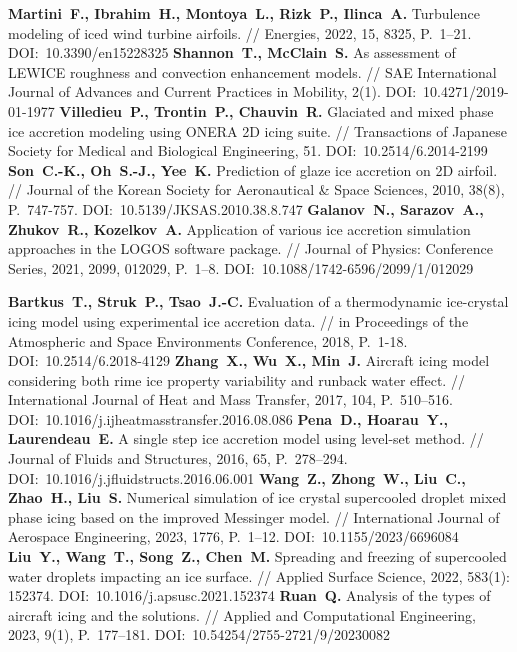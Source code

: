 \begin{thebibliography}{99}
\textbf{Martini~F., Ibrahim~H., Montoya~L., Rizk~P., Ilinca~A.} Turbulence modeling of iced wind turbine airfoils. // Energies, 2022, 15, 8325, P.~1–21. DOI:~10.3390/en15228325
\textbf{Shannon~T., McClain~S.} As assessment of LEWICE roughness and convection enhancement models. // SAE International Journal of Advances and Current Practices in Mobility, 2(1). DOI:~10.4271/2019-01-1977
\textbf{Villedieu~P., Trontin~P., Chauvin~R.} Glaciated and mixed phase ice accretion modeling using ONERA 2D icing suite. // Transactions of Japanese Society for Medical and Biological Engineering, 51. DOI:~10.2514/6.2014-2199
\textbf{Son~C.-K., Oh~S.-J., Yee~K.} Prediction of glaze ice accretion on 2D airfoil. // Journal of the Korean Society for Aeronautical \& Space Sciences, 2010, 38(8), P.~747-757. DOI:~10.5139/JKSAS.2010.38.8.747
\textbf{Galanov~N., Sarazov~A., Zhukov~R., Kozelkov~A.} Application of various ice accretion simulation approaches in the LOGOS software package. // Journal of Physics: Conference Series, 2021, 2099, 012029, P.~1–8. DOI:~10.1088/1742-6596/2099/1/012029

\textbf{Bartkus~T., Struk~P., Tsao~J.-C.} Evaluation of a thermodynamic ice-crystal icing model using experimental ice accretion data. // in Proceedings of the Atmospheric and Space Environments Conference, 2018, P.~1-18. DOI:~10.2514/6.2018-4129
\textbf{Zhang~X., Wu~X., Min~J.} Aircraft icing model considering both rime ice property variability and runback water effect. // International Journal of Heat and Mass Transfer, 2017, 104, P.~510–516. DOI:~10.1016/j.ijheatmasstransfer.2016.08.086
\textbf{Pena~D., Hoarau~Y., Laurendeau~E.} A single step ice accretion model using level-set method. // Journal of Fluids and Structures, 2016, 65, P.~278–294. DOI:~10.1016/j.jfluidstructs.2016.06.001
\textbf{Wang~Z., Zhong~W., Liu~C., Zhao~H., Liu~S.} Numerical simulation of ice crystal supercooled droplet mixed phase icing based on the improved Messinger model. // International Journal of Aerospace Engineering, 2023, 1776, P.~1–12. DOI:~10.1155/2023/6696084
\textbf{Liu~Y., Wang~T., Song~Z., Chen~M.} Spreading and freezing of supercooled water droplets impacting an ice surface. // Applied Surface Science, 2022, 583(1): 152374. DOI:~10.1016/j.apsusc.2021.152374
\textbf{Ruan~Q.} Analysis of the types of aircraft icing and the solutions. // Applied and Computational Engineering, 2023, 9(1), P.~177–181. DOI:~10.54254/2755-2721/9/20230082


\end{thebibliography}

